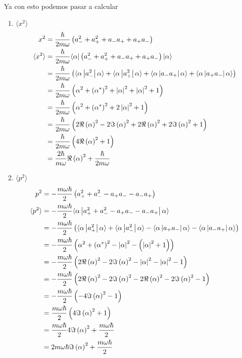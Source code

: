 \documentclass{report}
\newcommand{\rlangle}[1]{\langle\alpha\left|#1\right|\alpha\rangle}
\begin{document}
Ya con esto podemos pasar a calcular
\begin{enumerate}
  \item $\langle x^2 \rangle$
    \begin{align*}
      x^2 &= \frac{\hbar}{2m\omega} \paren{a_{-}^2 + a_{+}^2 + a_- a_+ + a_+a_-}\\
      \langle x^2 \rangle &= \frac{\hbar}{2m\omega} \langle \alpha |\paren{a_{-}^2 + a_{+}^2 + a_- a_+ + a_+a_-}| \alpha \rangle\\
      &= \frac{\hbar}{2m\omega} \paren{\rlangle{a_{-}^2} + \rlangle{a_{+}^2} + \rlangle{a_- a_+} + \rlangle{a_+a_-}}\\
      &= \frac{\hbar}{2m\omega} \paren{\alpha^2 + \paren{\alpha^*}^2 + \left|\alpha\right|^2 + \left|\alpha\right|^2 + 1}\\
      &= \frac{\hbar}{2m\omega} \paren{\alpha^2 + \paren{\alpha^*}^2 + 2\left|\alpha\right|^2+ 1}\\
      &= \frac{\hbar}{2m\omega} \paren{2\Re \paren{\alpha}^2 - 2\Im \paren{\alpha}^2 + 2\Re\paren{\alpha}^2 + 2\Im\paren{\alpha}^2 + 1}\\
      &= \frac{\hbar}{2m\omega} \paren{4\Re \paren{\alpha}^2 + 1}\\
      &= \frac{2\hbar}{m\omega}\Re \paren{\alpha}^2 + \frac{\hbar}{2m\omega}
    \end{align*}

  \item $\langle p^2 \rangle$
    \begin{align*}
      p^2 &= - \frac{m\omega\hbar}{2}\paren{a_{+}^2 + a_{-}^2 - a_+a_- - a_-a_+}\\
      \langle p^2 \rangle &= - \frac{m\omega\hbar}{2}\rlangle{a_{+}^2 + a_{-}^2 - a_+a_- - a_-a_+}\\
      &= - \frac{m\omega\hbar}{2}\paren{\rlangle{a_{+}^2} + \rlangle{a_{-}^2} - \rlangle{a_+a_-} - \rlangle{a_-a_+}}\\
      &= - \frac{m\omega\hbar}{2}\paren{\alpha^2 + \paren{\alpha^*}^2 - \left|\alpha\right|^2 - \paren{\left|\alpha\right|^2 + 1}}\\
      &= - \frac{m\omega\hbar}{2}\paren{2\Re\paren{\alpha}^2 - 2\Im\paren{\alpha}^2 - \left|\alpha\right|^2 - \left|\alpha\right|^2 - 1}\\
      &= - \frac{m\omega\hbar}{2}\paren{2\Re\paren{\alpha}^2 - 2\Im\paren{\alpha}^2 - 2\Re\paren{\alpha}^2 - 2\Im\paren{\alpha}^2 - 1}\\
      &= - \frac{m\omega\hbar}{2}\paren{- 4\Im\paren{\alpha}^2 - 1}\\
      &= \frac{m\omega\hbar}{2}\paren{4\Im\paren{\alpha}^2 + 1}\\
      &= \frac{m\omega\hbar}{2}4\Im\paren{\alpha}^2 + \frac{m\omega\hbar}{2}\\
      &= 2m\omega\hbar\Im\paren{\alpha}^2 + \frac{m\omega\hbar}{2}
    \end{align*}
\end{enumerate}
\end{document}
